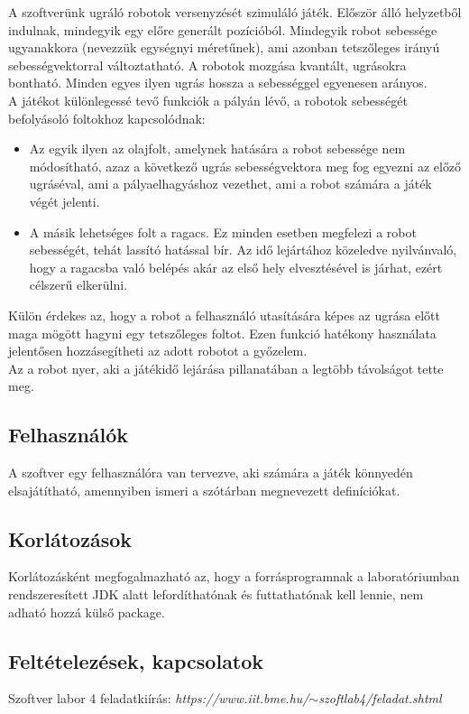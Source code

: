 A szoftverünk ugráló robotok versenyzését szimuláló játék. Először álló helyzetből indulnak, mindegyik egy előre generált pozícióból. Mindegyik robot sebessége ugyanakkora (nevezzük egységnyi méretűnek), ami azonban tetszőleges irányú sebességvektorral változtatható. A robotok mozgása kvantált, ugrásokra bontható. Minden egyes ilyen ugrás hossza a sebességgel egyenesen arányos. \\

A játékot különlegessé tevő funkciók a pályán lévő, a robotok sebességét befolyásoló foltokhoz kapcsolódnak:

\begin{itemize}
	\item Az egyik ilyen az olajfolt, amelynek hatására a robot sebessége nem módosítható, azaz a következő ugrás sebességvektora meg fog egyezni az előző ugráséval, ami a pályaelhagyáshoz vezethet, ami a robot számára a játék végét jelenti.
	\item A másik lehetséges folt a ragacs. Ez minden esetben megfelezi a robot sebességét, tehát lassító hatással bír. Az idő lejártához közeledve nyilvánvaló, hogy a ragacsba való belépés akár az első hely elvesztésével is járhat, ezért célszerű elkerülni.
\end{itemize}

Külön érdekes az, hogy a robot a felhasználó utasítására képes az ugrása előtt maga mögött hagyni egy tetszőleges foltot. Ezen funkció hatékony használata jelentősen hozzásegítheti az adott robotot a győzelem. \\

Az a robot nyer, aki a játékidő lejárása pillanatában a legtöbb távolságot tette meg.
 

\subsection{Felhasználók}

A szoftver egy felhasználóra van tervezve, aki számára a játék könnyedén elsajátítható, amennyiben ismeri a szótárban megnevezett definíciókat.

\subsection{Korlátozások}

Korlátozásként megfogalmazható az, hogy a forrásprogramnak a laboratóriumban rendszeresített JDK alatt lefordíthatónak és futtathatónak kell lennie, nem adható hozzá külső package.

\subsection{Feltételezések, kapcsolatok}

Szoftver labor 4 feladatkiírás: \textit{https://www.iit.bme.hu/$\sim$szoftlab4/feladat.shtml}